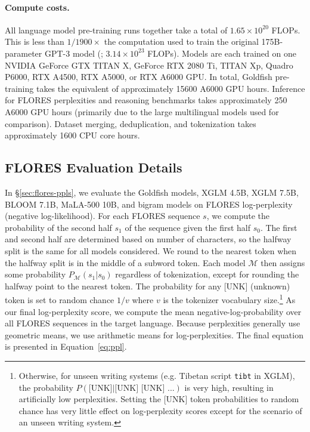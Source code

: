 \documentclass[11pt]{article}
\begin{document}
\paragraph{Compute costs.}
All language model pre-training runs together take a total of $1.65 \times 10^{20}$ FLOPs.
This is less than $1/1900\times$ the computation used to train the original 175B-parameter GPT-3 model (\citealp{brown-etal-2020-language}; $3.14 \times 10^{23}$ FLOPs).
Models are each trained on one NVIDIA GeForce GTX TITAN X, GeForce RTX 2080 Ti, TITAN Xp, Quadro P6000, RTX A4500, RTX A5000, or RTX A6000 GPU.
In total, Goldfish pre-training takes the equivalent of approximately 15600 A6000 GPU hours.
Inference for FLORES perplexities and reasoning benchmarks takes approximately 250 A6000 GPU hours (primarily due to the large multilingual models used for comparison).
Dataset merging, deduplication, and tokenization takes approximately 1600 CPU core hours.

\subsection{FLORES Evaluation Details}
\label{app:flores-details}

In \S\ref{sec:flores-ppls}, we evaluate the Goldfish models, XGLM 4.5B, XGLM 7.5B, BLOOM 7.1B, MaLA-500 10B, and bigram models on FLORES log-perplexity (negative log-likelihood).
For each FLORES sequence $s$, we compute the probability of the second half $s_1$ of the sequence given the first half $s_0$.
The first and second half are determined based on number of characters, so the halfway split is the same for all models considered.
We round to the nearest token when the halfway split is in the middle of a subword token.
Each model $\mathcal{M}$ then assigns some probability $P_{\mathcal{M}}(s_1 | s_0)$ regardless of tokenization, except for rounding the halfway point to the nearest token.
The probability for any [UNK] (unknown) token is set to random chance $1/v$ where $v$ is the tokenizer vocabulary size.\footnote{Otherwise, for unseen writing systems (e.g. Tibetan script \texttt{tibt} in XGLM), the probability $P(\textrm{[UNK]} | \textrm{[UNK] [UNK] ...})$ is very high, resulting in artificially low perplexities. Setting the [UNK] token probabilities to random chance has very little effect on log-perplexity scores except for the scenario of an unseen writing system.}
As our final log-perplexity score, we compute the mean negative-log-probability over all FLORES sequences in the target language.
Because perplexities generally use geometric means, we use arithmetic means for log-perplexities. 
The final equation is presented in Equation~\ref{eq:ppl}.
\end{document}
